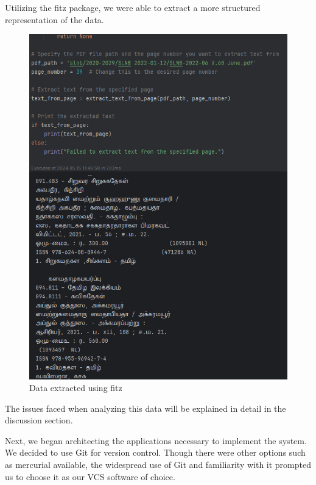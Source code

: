 Utilizing the fitz package, we were able to extract a more structured representation of the data.

\begin{figure}[htbp]
    \centering
    \includegraphics[width=1\textwidth]{../../assets/extracted.png}
    \caption{Data extracted using fitz}
    \label{fig:extracted}
\end{figure}

The issues faced when analyzing this data will be explained in detail in the discussion section.



Next, we began architecting the applications necessary to implement the system. We decided to use Git for version control. Though there were other options such as mercurial available, the widespread use of Git and familiarity with it prompted us to choose it as our VCS software of choice.